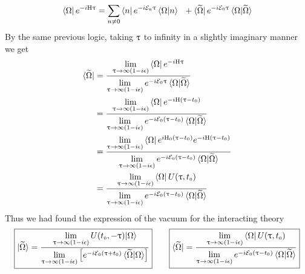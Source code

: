 \begin{align*}
   \vacb e^{-i\MH \ut}  =\sum\limits_{n\neq 0}\bra{n} e^{-i\SE\tund{n} \ut} \braket{\Omega|n}  \ \ +\bra{\widetilde{\Omega}}  e^{-i\SE\tund{0}\ut} \braket{\Omega|\widetilde{\Omega}}
\end{align*}
By the same previous logic, taking $\uptau$ to infinity in a slightly imaginary manner we get 
\begin{align*}
    \bra{\widetilde{\Omega}} &= \frac{\lim\limits_{\uptau \to \infty(1-i\epsilon)}  \bra{\Omega} e^{-i\mathrm{H} \uptau}  }{\lim\limits_{\uptau \to \infty(1-i\epsilon)}   e^{-i\mathcal E_{\text{\tiny 0}}\uptau} \braket{\Omega|\widetilde{\Omega}}} \\
    &= \frac{\lim\limits_{\uptau \to \infty(1-i\epsilon)}  \bra{\Omega} e^{-i\mathrm{H}( \uptau-{t_{\text{\tiny 0}}})}  }{\lim\limits_{\uptau \to \infty(1-i\epsilon)}   e^{-i\mathcal E_{\text{\tiny 0}}(\uptau-{t_{\text{\tiny 0}}})} \braket{\Omega|\widetilde{\Omega}}}\\
    &=\frac{\lim\limits_{\uptau \to \infty(1-i\epsilon)}  \bra{\Omega} e^{i\mathrm{H}_{\text{\tiny 0}}( \uptau-{t_{\text{\tiny 0}}})} e^{-i\mathrm{H}( \uptau-{t_{\text{\tiny 0}}})}  }{\lim\limits_{\uptau \to \infty(1-i\epsilon)}   e^{-i\mathcal E_{\text{\tiny 0}}(\uptau-{t_{\text{\tiny 0}}})} \braket{\Omega|\widetilde{\Omega}}}\\
    &=\frac{\lim\limits_{\uptau \to \infty(1-i\epsilon)}  \bra{\Omega} U(\uptau,{t_{\text{\tiny 0}}}) }{\lim\limits_{\uptau \to \infty(1-i\epsilon)}   e^{-i\mathcal E_{\text{\tiny 0}}(\uptau-{t_{\text{\tiny 0}}})} \braket{\Omega|\widetilde{\Omega}}}\\
\end{align*}
Thus we had found the expression of the vacuum for the interacting theory 
\begin{equation}\label{eqn:vacuum}
     \boxed{\ket{\widetilde{\Omega}} = \frac{\lim\limits_{\uptau \to \infty(1-i\epsilon)}  U ({t_{\text{\tiny 0}}}, -\uptau) {\ket{\Omega}}  }{\lim\limits_{\uptau \to \infty(1-i\epsilon)} \qty[e^{-i\mathcal E_{\text{\tiny 0}}(\uptau+{t_{\text{\tiny 0}}})} \braket{\widetilde{\Omega}|\Omega}]}}\qquad \boxed{ \bra{\widetilde{\Omega}} =\frac{\lim\limits_{\uptau \to \infty(1-i\epsilon)}  \bra{\Omega} U(\uptau,{t_{\text{\tiny 0}}}) }{\lim\limits_{\uptau \to \infty(1-i\epsilon)}   e^{-i\mathcal E_{\text{\tiny 0}}(\uptau-{t_{\text{\tiny 0}}})} \braket{\Omega|\widetilde{\Omega}}}}
\end{equation}
